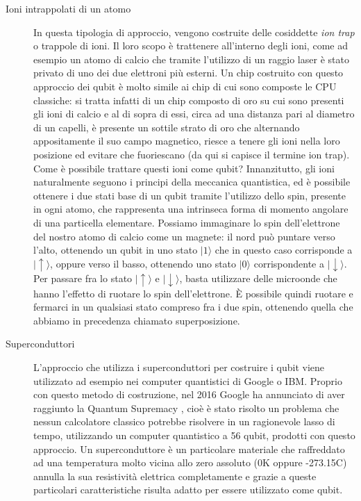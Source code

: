 \begin{description}
  \item[Ioni intrappolati di un atomo] In questa tipologia di approccio, vengono costruite delle cosiddette \textit{ion trap} o trappole di ioni. Il loro scopo è trattenere all'interno degli ioni, come ad esempio un atomo di calcio che tramite l'utilizzo di un raggio laser è stato privato di uno dei due elettroni più esterni. Un chip costruito con questo approccio dei qubit è molto simile ai chip di cui sono composte le CPU classiche: si tratta infatti di un chip composto di oro su cui sono presenti gli ioni di calcio e al di sopra di essi, circa ad una distanza pari al diametro di un capelli, è presente un sottile strato di oro che alternando appositamente il suo campo magnetico, riesce a tenere gli ioni nella loro posizione ed evitare che fuoriescano (da qui si capisce il termine ion trap). \\
  Come è possibile trattare questi ioni come qubit? Innanzitutto, gli ioni naturalmente seguono i principi della meccanica quantistica, ed è possibile ottenere i due stati base di un qubit tramite l'utilizzo dello spin, presente in ogni atomo, che rappresenta una intrinseca forma di momento angolare di una particella elementare. Possiamo immaginare lo spin dell'elettrone del nostro atomo di calcio come un magnete: il nord può puntare verso l'alto, ottenendo un qubit in uno stato \(|1\rangle\) che in questo caso corrisponde a \(|\uparrow\rangle\), oppure verso il basso, ottenendo uno stato \(|0\rangle\) corrispondente a \(|\downarrow\rangle\). Per passare fra lo stato \(|\uparrow\rangle\) e \(|\downarrow\rangle\), basta utilizzare delle microonde che hanno l'effetto di ruotare lo spin dell'elettrone. È possibile quindi ruotare e fermarci in un qualsiasi stato compreso fra i due spin, ottenendo quella che abbiamo in precedenza chiamato superposizione.
  \item[Superconduttori] L'approccio che utilizza i superconduttori per costruire i qubit viene utilizzato ad esempio nei computer quantistici di Google o IBM. Proprio con questo metodo di costruzione, nel 2016 Google ha annunciato di aver raggiunto la Quantum Supremacy \cite{quantum_supremacy}, cioè è stato risolto un problema che nessun calcolatore classico potrebbe risolvere in un ragionevole lasso di tempo, utilizzando un computer quantistico a 56 qubit, prodotti con questo approccio. Un superconduttore è un particolare materiale che raffreddato ad una temperatura molto vicina allo zero assoluto (0K oppure -273.15C) annulla la sua resistività elettrica completamente e grazie a queste particolari caratteristiche risulta adatto per essere utilizzato come qubit.
\end{description}